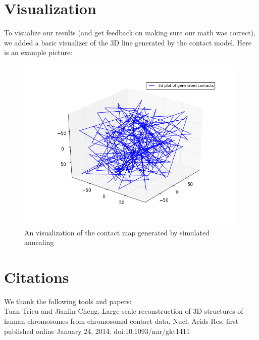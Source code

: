 \documentclass{article}
\begin{document}
\section{Visualization}

To visualize our results (and get feedback on making sure our math was correct), we added a basic visualizer of the 3D line generated by the contact model.  Here is an example picture:


\begin{figure}[H]
\begin{center}
\includegraphics[width=\textwidth]{sa_150}
\caption{An visualization of the contact map generated by simulated annealing}
\label{Fig:sa_150}
\end{center}
\end{figure}

\section{Citations}

We thank the following tools and papers: \\

Tuan Trieu and Jianlin Cheng.  Large-scale reconstruction of 3D structures of human chromosomes from chromosomal contact data.  Nucl. Acids Res. first published online January 24, 2014. doi:10.1093/nar/gkt1411
\end{document}
